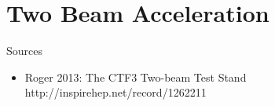\section{Two Beam Acceleration}

Sources
\begin{itemize}
\item
Roger 2013: The CTF3 Two-beam Test Stand 
http://inspirehep.net/record/1262211
\end{itemize}

